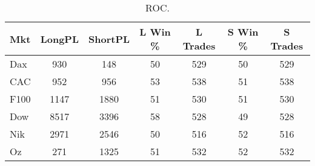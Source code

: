 \begin{table}[ht]
\centering
\caption[ROC]{ROC.} 
\label{tab:mac_ob_results}
\begin{tabular}{lcccccc}
  \toprule Mkt & LongPL & ShortPL & L Win \% & L Trades & S Win \% & S Trades \\ 
  \midrule Dax & 930 & 148 & 50 & 529 & 50 & 529 \\ 
  CAC & 952 & 956 & 53 & 538 & 51 & 538 \\ 
  F100 & 1147 & 1880 & 51 & 530 & 51 & 530 \\ 
  Dow & 8517 & 3396 & 58 & 528 & 49 & 528 \\ 
  Nik & 2971 & 2546 & 50 & 516 & 52 & 516 \\ 
  Oz & 271 & 1325 & 51 & 532 & 52 & 532 \\ 
   \bottomrule \end{tabular}
\end{table}
